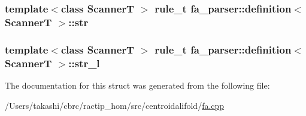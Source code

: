 \hypertarget{structfa__parser_1_1definition_a9b16d6bb1530e878a04ccd364dc2302e}{
\subsubsection[{str}]{\setlength{\rightskip}{0pt plus 5cm}template$<$class Scanner\+T $>$ {\bf rule\+\_\+t} {\bf fa\+\_\+parser\+::definition}$<$ Scanner\+T $>$\+::str}}\label{structfa__parser_1_1definition_a9b16d6bb1530e878a04ccd364dc2302e}
\hypertarget{structfa__parser_1_1definition_a458a9f843e27dd3579418e2f1f39d4d0}{
\subsubsection[{str\+\_\+l}]{\setlength{\rightskip}{0pt plus 5cm}template$<$class Scanner\+T $>$ {\bf rule\+\_\+t} {\bf fa\+\_\+parser\+::definition}$<$ Scanner\+T $>$\+::str\+\_\+l}}\label{structfa__parser_1_1definition_a458a9f843e27dd3579418e2f1f39d4d0}


The documentation for this struct was generated from the following file\+:\begin{DoxyCompactItemize}
\item 
/\+Users/takashi/cbrc/ractip\+\_\+hom/src/centroidalifold/\hyperlink{centroidalifold_2fa_8cpp}{fa.\+cpp}\end{DoxyCompactItemize}
